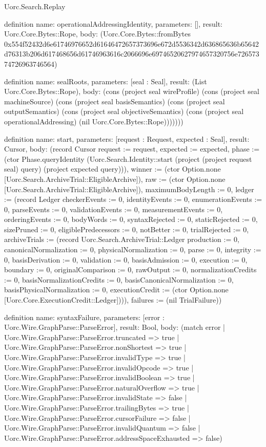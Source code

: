 \begin{lexlean}{Uorc.Search.Replay}
\begin{semanticmodule}
definition{
  name: operationalAddressingIdentity,
  parameters: [],
  result: Uorc.Core.Bytes::Rope,
  body: (Uorc.Core.Bytes::fromBytes 0x554f52432d6e61746976652d61646472657373696e672d5536342d636865636b65642d76313b206d617468656d61746963616c2066696e69746520627974657320756e72657374726963746564)
}

definition{
  name: sealRoots,
  parameters: [seal : Seal],
  result: (List Uorc.Core.Bytes::Rope),
  body: (cons (project seal wireProfile) (cons (project seal machineSource) (cons (project seal basisSemantics) (cons (project seal outputSemantics) (cons (project seal objectiveSemantics) (cons (project seal operationalAddressing) (nil Uorc.Core.Bytes::Rope)))))))
}

definition{
  name: start,
  parameters: [request : Request, expected : Seal],
  result: Cursor,
  body: (record Cursor {request := request, expected := expected, phase := (ctor Phase.queryIdentity (Uorc.Search.Identity::start (project (project request seal) query) (project expected query))), winner := (ctor Option.none [Uorc.Search.ArchiveTrial::EligibleArchive]), raw := (ctor Option.none [Uorc.Search.ArchiveTrial::EligibleArchive]), maximumBodyLength := 0, ledger := (record Ledger {checkerEvents := 0, identityEvents := 0, enumerationEvents := 0, parseEvents := 0, validationEvents := 0, measurementEvents := 0, orderingEvents := 0, bodyWords := 0, syntaxRejected := 0, staticRejected := 0, sizePruned := 0, eligiblePredecessors := 0, notBetter := 0, trialRejected := 0, archiveTrials := (record Uorc.Search.ArchiveTrial::Ledger {production := 0, canonicalNormalization := 0, physicalNormalization := 0, parse := 0, integrity := 0, basisDerivation := 0, validation := 0, basisAdmission := 0, execution := 0, boundary := 0, originalComparison := 0, rawOutput := 0, normalizationCredits := 0, basisNormalizationCredits := 0, basisCanonicalNormalization := 0, basisPhysicalNormalization := 0, executionCredit := (ctor Option.none [Uorc.Core.ExecutionCredit::Ledger])})}), failures := (nil TrialFailure)})
}

definition{
  name: syntaxFailure,
  parameters: [error : Uorc.Wire.GraphParse::ParseError],
  result: Bool,
  body: (match error
    | Uorc.Wire.GraphParse::ParseError.truncated => true
    | Uorc.Wire.GraphParse::ParseError.nonShortest => true
    | Uorc.Wire.GraphParse::ParseError.invalidType => true
    | Uorc.Wire.GraphParse::ParseError.invalidOpcode => true
    | Uorc.Wire.GraphParse::ParseError.invalidBoolean => true
    | Uorc.Wire.GraphParse::ParseError.naturalOverflow => true
    | Uorc.Wire.GraphParse::ParseError.invalidState => false
    | Uorc.Wire.GraphParse::ParseError.trailingBytes => true
    | Uorc.Wire.GraphParse::ParseError.cursorFailure => false
    | Uorc.Wire.GraphParse::ParseError.invalidQuantum => false
    | Uorc.Wire.GraphParse::ParseError.addressSpaceExhausted => false)
}


\end{semanticmodule}
\end{lexlean}
